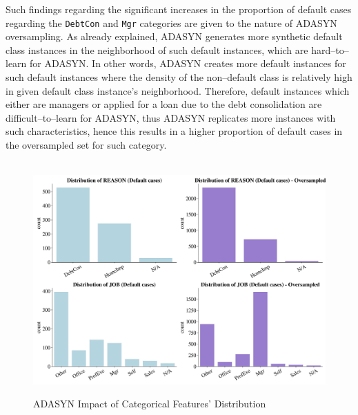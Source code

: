\newpage
Such findings regarding the significant increases in the proportion of default cases regarding the \texttt{DebtCon} and \texttt{Mgr} categories are given to the nature of ADASYN oversampling.
As already explained, ADASYN generates more synthetic default class instances in the neighborhood of such default instances, which are hard--to--learn for ADASYN.
In other words, ADASYN creates more default instances for such default instances where the density of the non--default class is relatively high in given default class instance's neighborhood.
Therefore, default instances which either are managers or applied for a loan due to the debt consolidation are difficult--to--learn for ADASYN, thus ADASYN replicates more instances with such characteristics, hence this results in a higher proportion of default cases in the oversampled set for such category.


\begin{figure}[H]
    \centering
    \caption{ADASYN Impact of Categorical Features' Distribution}\vspace{0.5em}
    \label{fig:adasynimpact}\
    \includegraphics[width=130mm]{Figures/Categorical_Features_Distribution_OS_Default.jpg}

    \vspace{-1em}
\end{figure}



\newpage
